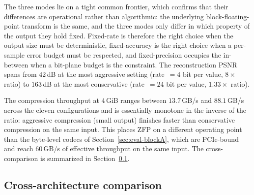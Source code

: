 The three modes lie on a tight common frontier, which confirms that
their differences are operational rather than algorithmic: the
underlying block-floating-point transform is the same, and the three
modes only differ in which property of the output they hold fixed.
Fixed-rate is therefore the right choice when the output size must be
deterministic, fixed-accuracy is the right choice when a per-sample
error budget must be respected, and fixed-precision occupies the
in-between when a bit-plane budget is the constraint. The
reconstruction PSNR spans from $42$\,dB at the most aggressive setting
(rate~$=4$ bit per value, $8\times$ ratio) to $163$\,dB at the most
conservative (rate~$=24$ bit per value, $1.33\times$ ratio).

The compression throughput at $4$\,GiB ranges between
$13.7$\,GB/s and $88.1$\,GB/s across the eleven configurations and
is essentially monotone in the inverse of the ratio: aggressive
compression (small output) finishes faster than conservative
compression on the same input. This places ZFP on a different
operating point than the byte-level codecs of Section~\ref{sec:eval-blockA},
which are PCIe-bound and reach $60$\,GB/s of effective throughput on
the same input. The cross-comparison is summarized in
Section~\ref{sec:eval-crossarch}.

\subsection{Cross-architecture comparison}
\label{sec:eval-crossarch}

